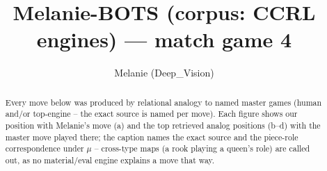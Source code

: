\documentclass[11pt]{article}
\title{Melanie-BOTS (corpus: CCRL engines) — match game 4}
\author{Melanie (Deep\_Vision)}
\date{}
\begin{document}
\maketitle

\begin{abstract}Every move below was produced by relational analogy to named master games (human and/or top-engine -- the exact source is named per move). Each figure shows our position with Melanie's move (a) and the top retrieved analog positions (b--d) with the master move played there; the caption names the exact source and the piece-role correspondence under $\mu$ -- cross-type maps (a rook playing a queen's role) are called out, as no material/eval engine explains a move that way.\end{abstract}

\begin{figure}[p]\centering
\begin{subfigure}{0.46\textwidth}\centering
\resizebox{\linewidth}{!}{%
\newchessgame
\chessboard[
  setfen={r1bq1rk1/pppp1ppp/3n1b2/4R3/3P4/8/PPP2PPP/RNBQ1BK1 w - - 1 10},
  showmover=false,
  pgfstyle=straightmove, color=movearrow, markmove={e5-e1}
]}
\caption{}
\end{subfigure}\hfill
\begin{subfigure}{0.46\textwidth}\centering
\resizebox{\linewidth}{!}{%
\newchessgame
\chessboard[
  setfen={r1bqnrk1/pppp1ppp/5b2/4R3/2PP4/8/PP3PPP/RNBQ1BK1 w - - 1 11},
  showmover=false,
  pgfstyle=straightmove, color=movearrow, markmove={e5-e1}
]}
\caption{}
\end{subfigure}
\\[4pt]
\begin{subfigure}{0.46\textwidth}\centering
\resizebox{\linewidth}{!}{%
\newchessgame
\chessboard[
  setfen={r1bq1rk1/pppp1ppp/3n1b2/4R3/3P4/8/PPP2PPP/RNBQ1BK1 w - - 1 10},
  showmover=false,
  pgfstyle=straightmove, color=movearrow, markmove={e5-e1}
]}
\caption{}
\end{subfigure}\hfill
\begin{subfigure}{0.46\textwidth}\centering
\resizebox{\linewidth}{!}{%
\newchessgame
\chessboard[
  setfen={r1bq1rk1/pppp1ppp/3n1b2/4R3/3P4/8/PPP2PPP/RNBQ1BK1 w - - 1 10},
  showmover=false,
  pgfstyle=straightmove, color=movearrow, markmove={e5-e1}
]}
\caption{}
\end{subfigure}

\end{figure}
\end{document}
